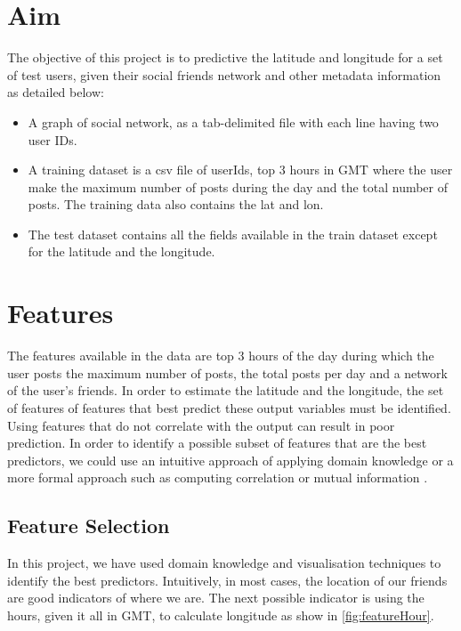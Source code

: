 

\section{Aim}
The objective of this project is to predictive the latitude and longitude for a set of test users, given their social friends network and other metadata information as detailed below:

\begin{itemize}
\item A graph of social network, as a tab-delimited file with each line having two user IDs.
\item A training dataset is a csv file of userIds, top 3 hours in GMT where the user make the maximum number of posts during the day and the total number of posts. The training data also contains the lat and lon.
\item The test dataset contains all the fields available in the train dataset except for the latitude and the longitude.
\end{itemize}



\section{Features}
The features available in the data are top 3 hours of the day during which the user posts the maximum number of posts, the total posts per day and  a network of the user's friends. In order to estimate the latitude and the longitude, the set of features of features that best predict these output variables must be identified.  Using features that do not correlate with the output can result in poor prediction.  In order to  identify a possible subset of features that are the best predictors, we could use an intuitive approach of applying  domain knowledge or a more formal approach such as computing correlation or mutual information \cite{Guyon2003}.




\subsection{Feature Selection}
In this project, we have used domain knowledge and visualisation techniques to identify the best predictors.  Intuitively, in most cases, the location of our friends are good indicators of where we are. The next possible indicator is using the hours, given it all in GMT, to calculate longitude as show in \ref{fig:featureHour}. 



